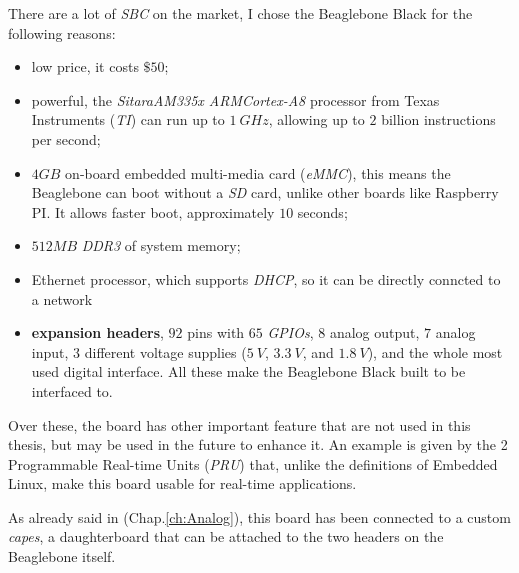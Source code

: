 There are a lot of \textit{SBC} on the market, I chose the Beaglebone Black for the following reasons:
\begin{itemize}
	\item low price, it costs $\$50 $;
	\item powerful, the \textit{Sitara\texttrademark AM335x ARM\textregistered Cortex\texttrademark-A8} processor from Texas Instruments (\textit{TI}) can run up to $1\ GHz$, allowing up to $2$ billion instructions per second;
	\item $4GB$ on-board embedded multi-media card (\textit{eMMC}), this means the Beaglebone can boot without a \textit{SD} card, unlike other boards like Raspberry PI. It allows faster boot, approximately $10$ seconds;
	\item $512MB$ \textit{DDR3} of system memory;
	\item Ethernet processor, which supports \textit{DHCP}, so it can be directly conncted to a network
	\item \textbf{expansion headers}, $92$ pins with $65$ \textit{GPIOs}, $8$ analog output, $7$ analog input, $3$ different voltage supplies ($5\ V$, $3.3\ V$, and $1.8\ V$), and the whole most used digital interface. All these make the Beaglebone Black built to be interfaced to. 
	
\end{itemize}
Over these, the board has other important feature that are not used in this thesis, but may be used in the future to enhance it. An example is given by the 2 Programmable Real-time Units (\textit{PRU}) that, unlike the definitions of Embedded Linux, make this board usable for real-time applications.

As already said in (Chap.\ref{ch:Analog}), this board has been connected to a custom \textit{capes}, a daughterboard that can be attached to the two headers on the Beaglebone itself.
